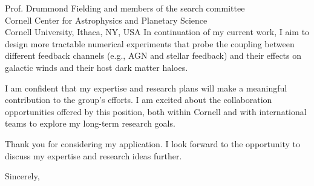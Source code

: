 \documentclass[11pt]{letter}
\begin{document}
\begin{letter}{Prof. Drummond Fielding and members of the search committee \\ Cornell Center for Astrophysics and Planetary Science \\ Cornell University, Ithaca, NY, USA}
In continuation of my current work, I aim to design more tractable numerical experiments that probe the coupling between different feedback channels (e.g., AGN and stellar feedback) and their effects on galactic winds and their host dark matter haloes.  

I am confident that my expertise and research plans will make a meaningful contribution to the group's efforts. I am excited about the collaboration opportunities offered by this position, both within Cornell and with international teams to explore my long-term research goals.

Thank you for considering my application. I look forward to the opportunity to discuss my expertise and research ideas further.  

\closing{Sincerely,}

\end{letter}
\end{document}
